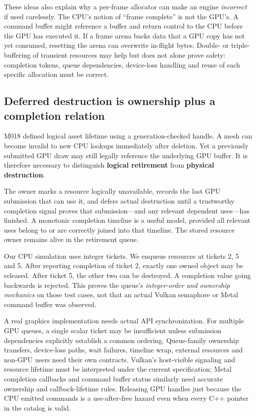 These ideas also explain why a per-frame allocator can make an engine \emph{incorrect} if used carelessly. The CPU's notion of ``frame complete'' is not the GPU's. A command buffer might reference a buffer and return control to the CPU before the GPU has executed it. If a frame arena backs data that a GPU copy has not yet consumed, resetting the arena can overwrite in-flight bytes. Double- or triple-buffering of transient resources may help but does not alone prove safety: completion tokens, queue dependencies, device-loss handling and reuse of each specific allocation must be correct.

\subsection{Deferred destruction is ownership plus a completion relation}\label{01-foundations-i-ch007-deferred-destruction-is-ownership-plus-a-completion-relation}

M018 defined logical asset lifetime using a generation-checked handle. A mesh can become invalid to new CPU lookups immediately after deletion. Yet a previously submitted GPU draw may still legally reference the underlying GPU buffer. It is therefore necessary to distinguish \textbf{logical retirement} from \textbf{physical destruction}.

The owner marks a resource logically unavailable, records the last GPU submission that can use it, and defers actual destruction until a trustworthy completion signal proves that submission---and any relevant dependent uses---has finished. A monotonic completion timeline is a useful model, provided all relevant uses belong to or are correctly joined into that timeline. The stored resource owner remains alive in the retirement queue.

Our CPU simulation uses integer tickets. We enqueue resources at tickets 2, 5 and 5. After reporting completion of ticket 2, exactly one owned object may be released. After ticket 5, the other two can be destroyed. A completion value going backwards is rejected. This proves the queue's \emph{integer-order and ownership mechanics} on those test cases, not that an actual Vulkan semaphore or Metal command buffer was observed.

A real graphics implementation needs actual API synchronization. For multiple GPU queues, a single scalar ticket may be insufficient unless submission dependencies explicitly establish a common ordering. Queue-family ownership transfers, device-loss paths, wait failures, timeline wrap, external resources and non-GPU users need their own contracts. Vulkan's host-visible signaling and resource lifetime must be interpreted under the current specification; Metal completion callbacks and command buffer status similarly need accurate ownership and callback-lifetime rules. Releasing GPU handles just because the CPU emitted commands is a use-after-free hazard even when every C++ pointer in the catalog is valid.

